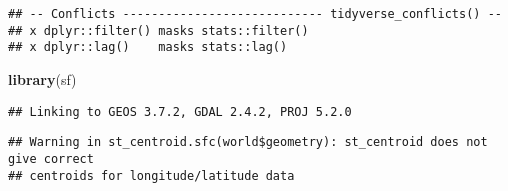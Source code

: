 \documentclass[
  xelatex,ja=standard]{bxjsarticle}
\newenvironment{Shaded}{\begin{snugshade}}{\end{snugshade}}
\newcommand{\CommentTok}[1]{\textcolor[rgb]{0.56,0.35,0.01}{\textit{#1}}}
\newcommand{\KeywordTok}[1]{\textcolor[rgb]{0.13,0.29,0.53}{\textbf{#1}}}
\newcommand{\NormalTok}[1]{#1}
\newcommand{\OperatorTok}[1]{\textcolor[rgb]{0.81,0.36,0.00}{\textbf{#1}}}
\newcommand{\StringTok}[1]{\textcolor[rgb]{0.31,0.60,0.02}{#1}}
\begin{document}
\begin{verbatim}
## -- Conflicts ---------------------------- tidyverse_conflicts() --
## x dplyr::filter() masks stats::filter()
## x dplyr::lag()    masks stats::lag()
\end{verbatim}

\begin{Shaded}
\begin{Highlighting}[]
\KeywordTok{library}\NormalTok{(sf)}
\end{Highlighting}
\end{Shaded}

\begin{verbatim}
## Linking to GEOS 3.7.2, GDAL 2.4.2, PROJ 5.2.0
\end{verbatim}

\begin{Shaded}
\end{Shaded}

\begin{verbatim}
## Warning in st_centroid.sfc(world$geometry): st_centroid does not give correct
## centroids for longitude/latitude data
\end{verbatim}
\end{document}
